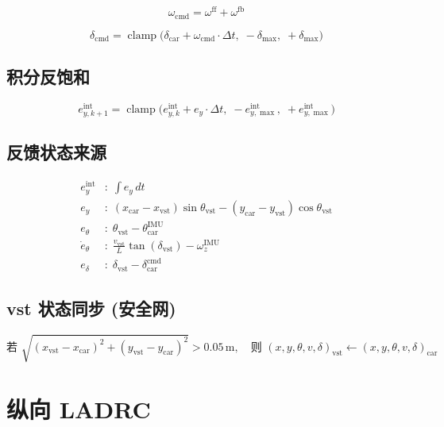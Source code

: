 \documentclass[11pt,a4paper]{article}
\begin{document}
\begin{equation}
\omega_{\text{cmd}} = \omega^{\text{ff}} + \omega^{\text{fb}}
\end{equation}

\begin{equation}
\delta_{\text{cmd}} = \operatorname{clamp}\!\big(\delta_{\text{car}} + \omega_{\text{cmd}} \cdot \Delta t,\; -\delta_{\max},\; +\delta_{\max}\big)
\end{equation}

\subsection{积分反饱和}

\begin{equation}
e_{y,k+1}^{\text{int}} = \operatorname{clamp}\!\big(e_{y,k}^{\text{int}} + e_y \cdot \Delta t,\; -e_{y,\max}^{\text{int}},\; +e_{y,\max}^{\text{int}}\big)
\end{equation}

\subsection{反馈状态来源}

\begin{align}
e_y^{\text{int}} &: \;\int e_y \,dt \\
e_y &: \;(x_{\text{car}} - x_{\text{vst}})\sin\theta_{\text{vst}} - (y_{\text{car}} - y_{\text{vst}})\cos\theta_{\text{vst}} \\
e_\theta &: \;\theta_{\text{vst}} - \theta_{\text{car}}^{\text{IMU}} \\
\dot{e}_\theta &: \;\frac{v_{\text{vst}}}{L}\tan(\delta_{\text{vst}}) - \omega_z^{\text{IMU}} \\
e_\delta &: \;\delta_{\text{vst}} - \delta_{\text{car}}^{\text{cmd}}
\end{align}

\subsection{vst 状态同步 (安全网)}

\begin{equation}
\text{若 } \sqrt{(x_{\text{vst}} - x_{\text{car}})^2 + (y_{\text{vst}} - y_{\text{car}})^2} > 0.05\,\text{m},
\quad \text{则 } (x,y,\theta,v,\delta)_{\text{vst}} \leftarrow (x,y,\theta,v,\delta)_{\text{car}}
\end{equation}

\section{纵向 LADRC}
\end{document}
